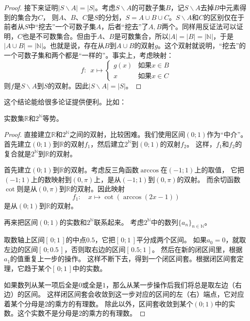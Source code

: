\documentclass[12pt,UTF8,fontset=none]{ctexbook}
\begin{document}
\begin{appendix}
\begin{proof}
    接下来证明$|S\backslash A| = |S|$。考虑$S\backslash A$的可数子集$B$，记$S\backslash A$去掉$B$中元素得到的集合为$C$，
    则$A$、$B$、$C$是$S$的分划，$S = A\cup B\cup C$。$S\backslash A$和$C$的区别仅在于前者从$S$中“挖去”一个可数子集$A$，后者“挖去”了$A,B$两个。同样用反证法可以证明，$C$也是不可数集合。但由于$A$、$B$是可数集合，所以$ |A| = |B| = |\mathbb{N}|$，于是$|A\cup B| = |\mathbb{N}|$。也就是说，存在从$B$到$A\cup B$的双射$g$。这个双射就说明，“挖去”的一个可数子集和两个都是“一样的”。事实上，考虑映射：
    $$ f:\,\,\,x\mapsto \left\{
        \begin{array}{cl}
            g(x) & \mbox{如果}x\in B \\
            x & \mbox{如果}x \in C
        \end{array}\right.
    $$
    则$f$是$S\backslash A$到$S$的双射。因此$|S\backslash A| = |S|$。
\end{proof}

这个结论能给很多论证提供便利。比如：
\begin{tm}\label{tm:a-1-20}
    实数集$\mathbb{R}$和$2^\mathbb{N}$等势。
\end{tm}

\begin{proof}
    直接建立$\mathbb{R}$和$2^\mathbb{N}$之间的双射，比较困难。我们使用区间$(0;1)$作为“中介”。
    首先建立$(0;1)$到$\mathbb{R}$的双射$f_1$，然后建立$2^\mathbb{N}$到$(0;1)$的双射$f_2$。
    这样，$f_1$和$f_2$的复合就是$2^\mathbb{N}$到$\mathbb{R}$的双射。
    
    首先建立$(0;1)$到$\mathbb{R}$的双射。考虑反三角函数$\arccos$在$(-1;1)$上的取值，
    它把$(-1;1)$上的数映射到$(0,\pi)$上，是从$(-1;1)$到$(0,\pi)$的双射。
    而余切函数$\cot$则是从$(0,\pi)$到$\mathbb{R}$的双射。因此映射
    $$ f_1 :\quad x \mapsto \cot{\left(\arccos{(2x-1)}\right)} $$
    是从$(0;1)$到$\mathbb{R}$的双射。

    再来把区间$(0;1)$的实数和$2^\mathbb{N}$联系起来。
    考虑$2^\mathbb{N}$中的数列$\{a_n\}_{n\in\mathbb{N}}$。

    取数轴上区间$[\,0;1\,]$的中点$0.5$，它把$[\,0;1\,]$平分成两个区间。
    如果$a_0 = 0$，就取左边的区间$[\,0;0.5\,]$，否则取右边的区间$[\,0.5;1\,]$。
    然后在新的闭区间里，根据$a_1$的值重复上一步的操作。
    这样不断下去，得到一个闭区间套。根据闭区间套定理，它趋于某个$[\,0;1\,]$中的实数。

    如果数列从某一项后全是$0$或全是$1$，那么从某一步操作后我们将总是取左边（右边）的区间。
    这样闭区间套会收敛到这一步对应的区间的左（右）端点，它对应着某个分母是$2$的乘方的有理数。
    除此以外，区间套收敛到某个$(0;1)$中的实数。这个实数不是分母是$2$的乘方的有理数。


\end{proof}
\end{appendix}
\end{document}
